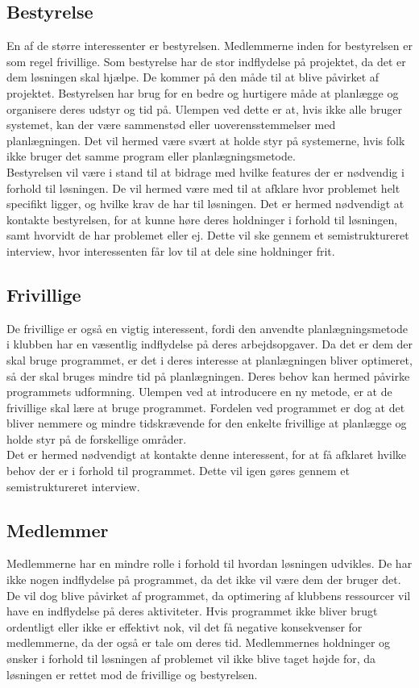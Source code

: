\subsection{Bestyrelse}
En af de større interessenter er bestyrelsen. Medlemmerne inden for bestyrelsen er som regel frivillige. Som bestyrelse har de stor indflydelse på projektet, da det er dem løsningen skal hjælpe. De kommer på den måde til at blive påvirket af projektet. Bestyrelsen har brug for en bedre og hurtigere måde at planlægge og organisere deres udstyr og tid på. Ulempen ved dette er at, hvis ikke alle bruger systemet, kan der være sammenstød eller uoverensstemmelser med planlægningen. Det vil hermed være svært at holde styr på systemerne, hvis folk ikke bruger det samme program eller planlægningsmetode.\\ 
Bestyrelsen vil være i stand til at bidrage med hvilke features der er nødvendig i forhold til løsningen. De vil hermed være med til at afklare hvor problemet helt specifikt ligger, og hvilke krav de har til løsningen. Det er hermed nødvendigt at kontakte bestyrelsen, for at kunne høre deres holdninger i forhold til løsningen, samt hvorvidt de har problemet eller ej. Dette vil ske gennem et semistruktureret interview, hvor interessenten får lov til at dele sine holdninger frit.

\subsection{Frivillige}
De frivillige er også en vigtig interessent, fordi den anvendte planlægningsmetode i klubben har en væsentlig indflydelse på deres arbejdsopgaver. Da det er dem der skal bruge programmet, er det i deres interesse at planlægningen bliver optimeret, så der skal bruges mindre tid på planlægningen. Deres behov kan hermed påvirke programmets udformning. Ulempen ved at introducere en ny metode, er at de frivillige skal lære at bruge programmet. Fordelen ved programmet er dog at det bliver nemmere og mindre tidskrævende for den enkelte frivillige at planlægge og holde styr på de forskellige områder. \\ Det er hermed nødvendigt at kontakte denne interessent, for at få afklaret hvilke behov der er i forhold til programmet. Dette vil igen gøres gennem et semistruktureret interview.

\subsection{Medlemmer}
Medlemmerne har en mindre rolle i forhold til hvordan løsningen udvikles. De har ikke nogen indflydelse på programmet, da det ikke vil være dem der bruger det. De vil dog blive påvirket af programmet, da optimering af klubbens ressourcer vil have en indflydelse på deres aktiviteter. Hvis programmet ikke bliver brugt ordentligt eller ikke er effektivt nok, vil det få negative konsekvenser for medlemmerne, da der også er tale om deres tid. Medlemmernes holdninger og ønsker i forhold til løsningen af problemet vil ikke blive taget højde for, da løsningen er rettet mod de frivillige og bestyrelsen.

